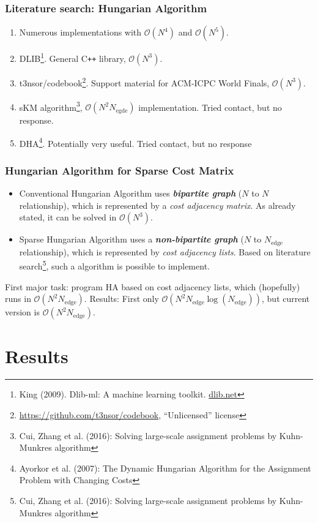 \documentclass[9pt, english]{beamer}
\newcommand{\CPP}{C\texttt{++} }
\begin{document}
\begin{frame}
\frametitle{Literature search: Hungarian Algorithm}
\begin{enumerate}
 \item Numerous implementations with \(\mathcal{O}(N^4)\) and \(\mathcal{O}(N^5)\).
 \item DLIB\footnote{King (2009). Dlib-ml: A machine learning toolkit. \url{dlib.net}}. General \CPP library, \(\mathcal{O}(N^3)\).
 \item t3nsor/codebook\footnote{\url{https://github.com/t3nsor/codebook}, ``Unlicensed'' license}. Support material for ACM-ICPC World Finals, \(\mathcal{O}(N^3)\).
 \item sKM algorithm\footnote{Cui, Zhang et al. (2016): Solving large-scale assignment problems by Kuhn-Munkres algorithm}, \(\mathcal{O}(N^2N_{\text{egde}})\) implementation. Tried contact, but no response.\item DHA\footnote{Ayorkor et al. (2007): The Dynamic Hungarian Algorithm for the Assignment Problem with Changing Costs}. Potentially very useful. Tried contact, but no response
\end{enumerate}
\end{frame}

\begin{frame}
\frametitle{Hungarian Algorithm for Sparse Cost Matrix}
\begin{itemize}
 \item Conventional Hungarian Algorithm uses \textit{\textbf{bipartite graph}} (\(N\) to \(N\) relationship), which is represented by a \textit{cost adjacency matrix}. As already stated, it can be solved in \(\mathcal{O}(N^3)\).
 \item Sparse Hungarian Algorithm uses a \textit{\textbf{non-bipartite graph}} (\(N\) to \(N_{\text{edge}}\) relationship), which is represented by \textit{cost adjacency lists}. Based on literature search\footnote{Cui, Zhang et al. (2016): Solving large-scale assignment problems by Kuhn-Munkres algorithm}, such a algorithm is possible to implement.
 \end{itemize}
First major task: program HA based on cost adjacency lists, which (hopefully) runs in \(\mathcal{O}(N^2 N_{\text{edge}})\).
\newline
Results: First only \(\mathcal{O}(N^2 N_{\text{edge}} \log{(N_{\text{edge}})})\), but current version is \(\mathcal{O}(N^2 N_{\text{edge}})\).
\end{frame}

\section{Results}
\end{document}
